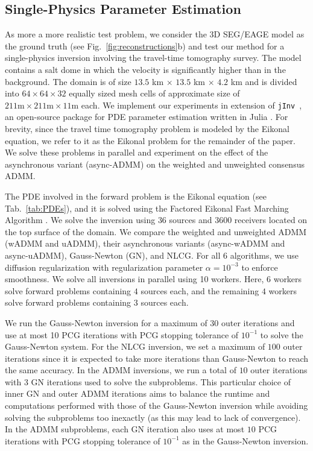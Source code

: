 \documentclass[11pt]{article}          %
\begin{document}
\subsection{Single-Physics Parameter Estimation}
\label{subsec:singlePhysics}
As more a more realistic test problem, we consider the 3D SEG/EAGE model \cite{aminzadeh1997} as the ground truth (see Fig.~\ref{fig:reconstructions}b) and test our method for a single-physics inversion involving the travel-time tomography survey. The model contains a salt dome in which the velocity is significantly higher than in the background. The domain is of size
$13.5$ km $\times$ $13.5$ km $\times$ $4.2$ km and is divided into $64 \times 64 \times 32$ equally sized mesh cells of approximate size of $211 \text{m} \times 211 \text{m}\times 11 \text{m}$ each. We implement our experiments in extension of \texttt{jInv}~\cite{ruthotto2017jinv}, an open-source package for PDE parameter estimation written in Julia \cite{bezanson2017julia}. For brevity, since the travel time tomography problem is modeled by the Eikonal equation, we refer to it as the Eikonal problem for the remainder of the paper. We solve these problems in parallel and experiment on the effect of the asynchronous variant (async-ADMM) on the weighted and unweighted consensus ADMM.

The PDE involved in the forward problem is the Eikonal equation (see Tab.~\ref{tab:PDEs}), and it is solved using the Factored Eikonal Fast Marching Algorithm \cite{treister2016fast}. We solve the inversion using $36$ sources and $3600$ receivers located on the top surface of the domain. We compare the weighted and unweighted ADMM (wADMM and uADMM), their asynchronous variants (async-wADMM and async-uADMM), Gauss-Newton (GN), and NLCG. For all 6 algorithms, we use diffusion regularization with regularization parameter $\alpha = 10^{-3}$ to enforce smoothness. We solve all inversions in parallel using 10 workers. Here, $6$ workers solve forward problems containing $4$ sources each, and the remaining $4$ workers solve forward problems containing $3$ sources each.

We run the Gauss-Newton inversion for a maximum of $30$ outer iterations and use at most 10 PCG iterations with PCG stopping tolerance of $10^{-1}$ to solve the Gauss-Newton system. For the NLCG inversion, we set a maximum of $100$ outer iterations since it is expected to take more iterations than Gauss-Newton to reach the same accuracy. In the ADMM inversions, we run a total of $10$ outer iterations with $3$ GN iterations used to solve the subproblems. This particular choice of inner GN and outer ADMM iterations aims to balance the runtime and computations performed with those of the Gauss-Newton inversion while avoiding solving the subproblems too inexactly (as this may lead to lack of convergence). In the ADMM subproblems, each GN iteration also uses at most $10$ PCG iterations with PCG stopping tolerance of $10^{-1}$ as in the Gauss-Newton inversion. 
\end{document}
